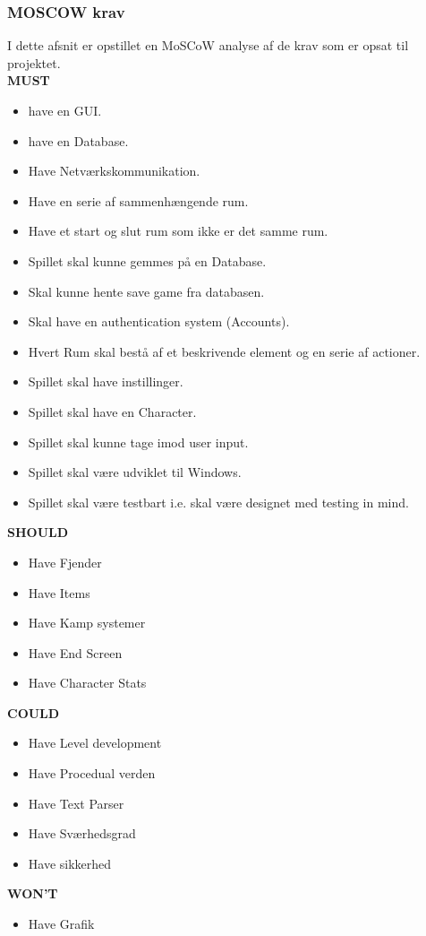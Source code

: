 \subsubsection{MOSCOW krav}
\label{sssec:MOSCOW}
I dette afsnit er opstillet en MoSCoW analyse af de krav som er opsat til projektet.\\

\textbf{MUST}
\begin{itemize}
  \item have en GUI.
  \item have en Database.
  \item Have Netværkskommunikation.
  \item Have en serie af sammenhængende rum.
  \item Have et start og slut rum som ikke er det samme rum.
  \item Spillet skal kunne gemmes på en Database.
  \item Skal kunne hente save game fra databasen.
  \item Skal have en authentication system (Accounts).
  \item Hvert Rum skal bestå af et beskrivende element og en serie af actioner.
  \item Spillet skal have instillinger.
  \item Spillet skal have en Character.
  \item Spillet skal kunne tage imod user input.
  \item Spillet skal være udviklet til Windows.
  \item Spillet skal være testbart i.e. skal være designet med testing in mind.
\end{itemize}


\textbf{SHOULD}
\begin{itemize}
  \item Have Fjender
  \item Have Items
  \item Have Kamp systemer
  \item Have End Screen
  \item Have Character Stats
\end{itemize}

\textbf{COULD}

\begin{itemize}
  \item Have Level development
  \item Have Procedual verden
  \item Have Text Parser
  \item Have Sværhedsgrad
  \item Have sikkerhed
\end{itemize}

\textbf{WON'T}
\begin{itemize}
  \item Have Grafik
\end{itemize}

 
